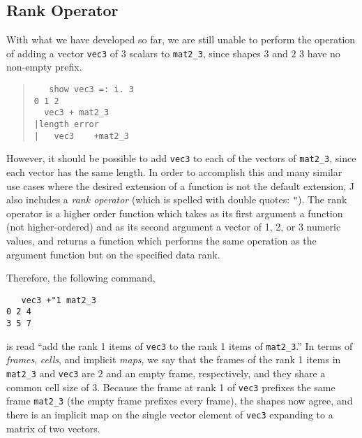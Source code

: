 \subsection{Rank Operator}
With what we have developed so far, we are still unable to perform the operation of 
adding a vector \texttt{vec3} of 3 scalars to \texttt{mat2\_3}, since shapes $3$ and $2$ $3$ have no non-empty prefix.

\begin{quote}
\begin{singlespacing}
\begin{small}
\begin{verbatim}
   show vec3 =: i. 3
0 1 2
  vec3 + mat2_3
|length error
|   vec3    +mat2_3
\end{verbatim}
\end{small}
\end{singlespacing}
\end{quote}

\noindent However, it should be possible to add \texttt{vec3} to each of the vectors of \texttt{mat2\_3}, since each vector has the same length.
In order to accomplish this and many similar use cases where the desired extension of a function is not the default extension, 
J also includes a \textit{rank operator} (which is spelled with double quotes: \texttt{"}).
The rank operator is a higher order function which takes as its first argument a function (not higher-ordered) %
and as its second argument a vector of 1, 2, or 3 numeric values, 
and returns a function which performs the same operation as the argument function but on the specified data rank\cite{rankanduni}.

Therefore, the following command, 

\begin{singlespacing}
\begin{small}
\begin{verbatim}
   vec3 +"1 mat2_3
0 2 4
3 5 7
\end{verbatim}
\end{small}
\end{singlespacing}

\noindent is read ``add the rank 1 items of \texttt{vec3} to the rank 1 items of \texttt{mat2\_3}.''
In terms of \textit{frames}, \textit{cells}, and implicit \textit{maps}, we say that
the frames of the rank 1 items in \texttt{mat2\_3} and \texttt{vec3} are $2$ and an empty frame, respectively, and they share a common cell size of $3$.
Because the frame at rank 1 of \texttt{vec3} prefixes the same frame \texttt{mat2\_3} (the empty frame prefixes every frame), 
the shapes now agree, and there is an implicit map on the single vector element of \texttt{vec3} expanding to a matrix of two vectors.

